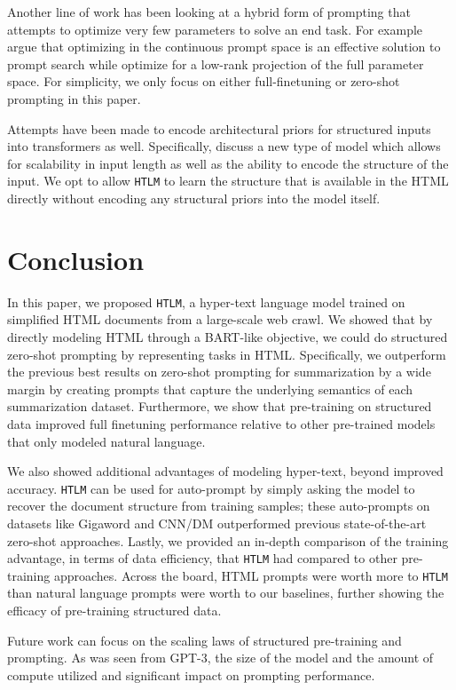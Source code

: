 \documentclass[11pt,a4paper]{article}
\newcommand{\HTLM}{\texttt{HTLM}}
\begin{document}
Another line of work has been looking at a hybrid form of prompting that attempts to optimize very few parameters to solve an end task. For example \citet{prefixtuning} argue that optimizing in the continuous prompt space is an effective solution to prompt search while \citet{intrinsic_dimensionality_finetuning} optimize for a low-rank projection of the full parameter space. For simplicity, we only focus on either full-finetuning or zero-shot prompting in this paper.


Attempts have been made to encode architectural priors for structured inputs into transformers as well. Specifically, \citet{etc_google} discuss a new type of model which allows for scalability in input length as well as the ability to encode the structure of the input. We opt to allow \HTLM{} to learn the structure that is available in the HTML directly without encoding any structural priors into the model itself.


\section{Conclusion}
In this paper, we proposed \HTLM{}, a hyper-text language model trained on simplified HTML documents from a large-scale web crawl. We showed that by directly modeling HTML through a BART-like objective, we could do structured zero-shot prompting by representing tasks in HTML. Specifically, we outperform the previous best results on zero-shot prompting for summarization by a wide margin by creating prompts that capture the underlying semantics of each summarization dataset. Furthermore, we show that pre-training on structured data improved full finetuning performance relative to other pre-trained models that only modeled natural language.

We also showed additional advantages of modeling hyper-text, beyond improved accuracy.  \HTLM{} can be used for auto-prompt  by simply asking the model to recover the document structure from training samples; these auto-prompts on datasets like Gigaword and CNN/DM outperformed previous state-of-the-art zero-shot approaches.
Lastly, we provided an in-depth comparison of the training advantage, in terms of data efficiency, that \HTLM{} had compared to other pre-training approaches. Across the board, HTML prompts were worth more to \HTLM{} than natural language prompts were worth to our baselines, further showing the efficacy of pre-training structured data.

Future work can focus on the scaling laws of structured pre-training and prompting. As was seen from GPT-3, the size of the model and the amount of compute utilized and significant impact on prompting performance.
\end{document}
